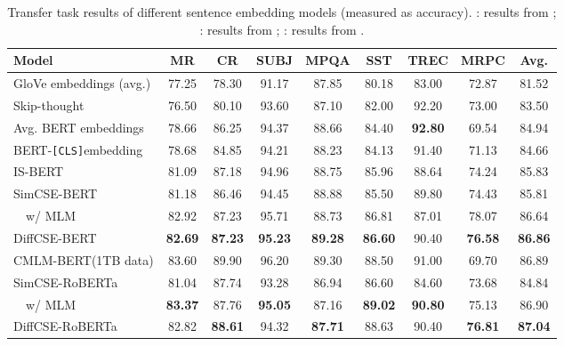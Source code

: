 \documentclass[11pt]{article}
\newcommand{\ba}{\xspace}
\newcommand\tf[1]{\textbf{#1}}
\newcommand\ttt[1]{\texttt{#1}}
\newcommand{\tableindent}{~~}
\newcommand{\cls}{\ttt{[CLS]}}
\begin{document}
\begin{table*}[ht]
    \begin{center}
    \centering
    \small

    \begin{tabular}{lcccccccc}
    \toprule
       \tf{Model} & \tf{MR} & \tf{CR} & \tf{SUBJ} & \tf{MPQA} & \tf{SST} & \tf{TREC} & \tf{MRPC} & \tf{Avg.}\\
    \midrule
        GloVe embeddings (avg.) & 77.25&    78.30&  91.17&  87.85&  80.18&  83.00& 72.87 & 81.52\\
        Skip-thought &  76.50& 80.10&  93.60&  87.10&  82.00&  92.20&  73.00& 83.50  \\
        \midrule
        Avg. BERT embeddings & 78.66 & 86.25 & 94.37 & 88.66 & 84.40 & \tf{92.80} & 69.54 & 84.94 \\
        BERT-\cls embedding & 78.68 & 84.85 & 94.21 & 88.23 & 84.13 & 91.40 & 71.13 & 84.66 \\
        IS-BERT\ba & 81.09 & 87.18 & 94.96 & 88.75 & 85.96 & 88.64 & 74.24 & 85.83 \\
        SimCSE-BERT\ba & 81.18&	86.46&	94.45&	88.88&	85.50&	89.80&	74.43&	85.81\\
        \tableindent w/ MLM & 82.92&	87.23&	95.71&	88.73&	86.81&	87.01&	78.07& 86.64\\
         DiffCSE-BERT\ba & \bf 82.69 & \bf 87.23 & \bf 95.23 & \bf 89.28 & \bf 86.60 & 90.40 & \bf 76.58 & \bf 86.86\\
        \midrule
        CMLM-BERT\ba {\scriptsize(1TB data)} & 83.60 & 89.90 & 96.20 & 89.30 & 88.50 & 91.00 & 69.70 & 86.89 \\
        \midrule
        SimCSE-RoBERTa\ba & 81.04 &	87.74 &	93.28 &	86.94	&86.60	&84.60	&73.68 &84.84 \\
        \tableindent w/ MLM & \tf{83.37}& 	87.76& 	\tf{95.05}	& 87.16	& \tf{89.02}	& \tf{90.80}	& 75.13 & 86.90\\
         DiffCSE-RoBERTa\ba & 82.82 & \bf 88.61 & 94.32 & \bf 87.71 & 88.63 & 90.40 & \bf 76.81 & \bf 87.04 \\
    \bottomrule
    \end{tabular}
    \end{center}
\vspace{-3.5mm}
    \caption{
        Transfer task results of different sentence embedding models (measured as accuracy). : results from \citet{reimers2019sentence};
        : results from \citet{zhang2020unsupervised};
        : results from \citet{gao2021simcse}.
    }
    \vspace{-3mm}
    \label{tab:main_transfer}
\end{table*}
 
\end{document}
